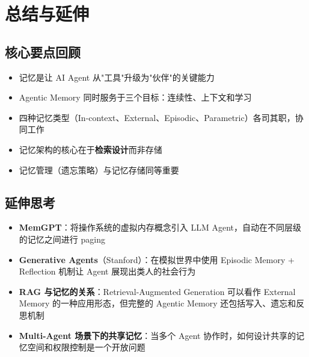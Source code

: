 \section{总结与延伸}

\subsection{核心要点回顾}

\begin{itemize}[leftmargin=2em]
    \item 记忆是让 AI Agent 从"工具"升级为"伙伴"的关键能力
    \item Agentic Memory 同时服务于三个目标：连续性、上下文和学习
    \item 四种记忆类型（In-context、External、Episodic、Parametric）各司其职，协同工作
    \item 记忆架构的核心在于\textbf{检索设计}而非存储
    \item 记忆管理（遗忘策略）与记忆存储同等重要
\end{itemize}

\subsection{延伸思考}

\begin{itemize}[leftmargin=2em]
    \item \textbf{MemGPT}：将操作系统的虚拟内存概念引入 LLM Agent，自动在不同层级的记忆之间进行 paging
    \item \textbf{Generative Agents}（Stanford）：在模拟世界中使用 Episodic Memory + Reflection 机制让 Agent 展现出类人的社会行为
    \item \textbf{RAG 与记忆的关系}：Retrieval-Augmented Generation 可以看作 External Memory 的一种应用形态，但完整的 Agentic Memory 还包括写入、遗忘和反思机制
    \item \textbf{Multi-Agent 场景下的共享记忆}：当多个 Agent 协作时，如何设计共享的记忆空间和权限控制是一个开放问题
\end{itemize}



